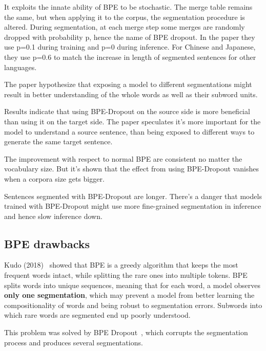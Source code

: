 It exploits the innate ability of BPE to be stochastic. The merge table remains the same, but when applying it to the corpus, the segmentation procedure is altered. During segmentation, at each merge step some merges are randomly dropped with probability p, hence the name of BPE dropout. In the paper they use p=0.1 during training and p=0 during inference. For Chinese and Japanese, they use p=0.6 to match the increase in length of segmented sentences for other languages.

The paper hypothesize that exposing a model to different segmentations might result in better understanding of the whole words as well as their subword units.

Results indicate that using BPE-Dropout on the source side is more beneficial than using it on the target side. The paper speculates it's more important for the model to understand a source sentence, than being exposed to different ways to generate the same target sentence.

The improvement with respect to normal BPE are consistent no matter the vocabulary size. But it's shown that the effect from using BPE-Dropout vanishes when a corpora size gets bigger.

Sentences segmented with BPE-Dropout are longer. There's a danger that models trained with BPE-Dropout might use more fine-grained segmentation in inference and hence slow inference down.

\subsection{BPE drawbacks}

Kudo (2018)~\cite{kudo-2018-subword} showed that BPE is a greedy algorithm that keeps the most frequent words intact, while splitting the rare ones into multiple tokens. BPE splits words into unique sequences, meaning that for each word, a model observes \textbf{only one segmentation}, which may prevent a model from better learning the compositionality of words and being robust to segmentation errors. Subwords into which rare words are segmented end up poorly understood.

This problem was solved by BPE Dropout~\cite{provilkov2019bpedropout}, which corrupts the segmentation process and produces several segmentations.

